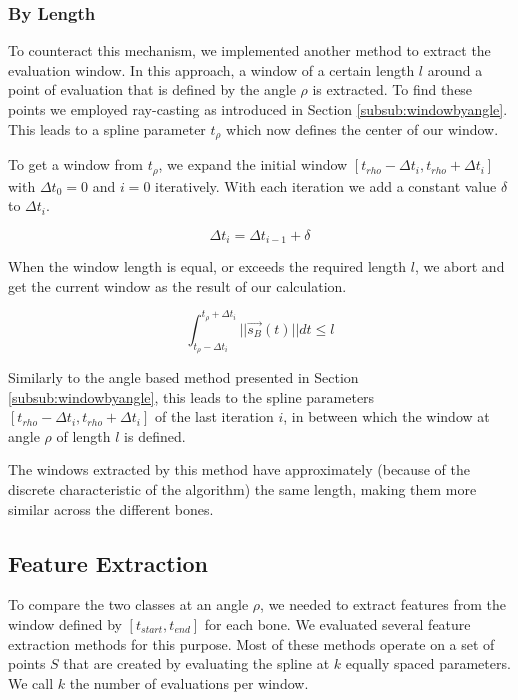 \documentclass[pdftex,12pt,a4paper]{report}
\begin{document}
\subsubsection{By Length}
\label{subsub:windowbylength}

To counteract this mechanism, we implemented another method to extract the evaluation window.
In this approach, a window of a certain length $l$ around a point of evaluation that is defined by the angle $\rho$ is extracted. To find these points we employed ray-casting
as introduced in Section \ref{subsub:windowbyangle}. This leads to a spline parameter
$t_\rho$ which now defines the center of our window.

To get a window from $t_\rho$, we expand the initial window $[t_{rho}-\Delta t_i,
t_{rho}+\Delta t_i]$ with $\Delta t_0 = 0$ and $i=0$ iteratively. With each iteration we add a constant value $\delta$ to $\Delta t_i$.

\begin{equation}
\Delta t_i = \Delta t_{i-1} + \delta
\end{equation}

When the window length is equal, or exceeds the required length $l$, we abort and get the current
window as the result of our calculation.

\begin{equation}
\int_{t_\rho - \Delta t_i}^{t_\rho + \Delta t_i} ||\vec{s_B}(t)|| dt \leq l
\end{equation}

Similarly to the angle based method presented in Section \ref{subsub:windowbyangle}, this leads to the spline parameters $[t_{rho}-\Delta t_i, t_{rho}+\Delta t_i]$ of the last iteration $i$, in between which the window at angle $\rho$ of length $l$ is defined.

The windows extracted by this method have approximately (because of the discrete
characteristic of the algorithm) the same length, making them more similar across
the different bones.

\subsection{Feature Extraction}
\label{sub:featureextraction}

To compare the two classes at an angle $\rho$, we needed to extract features from the
window defined by $[t_{start}, t_{end}]$ for each bone. We evaluated several feature
extraction methods for this purpose. Most of these methods operate on a set of points
$S$ that are created by evaluating the spline at $k$ equally spaced parameters. We call $k$ the number of evaluations per window.
\end{document}
